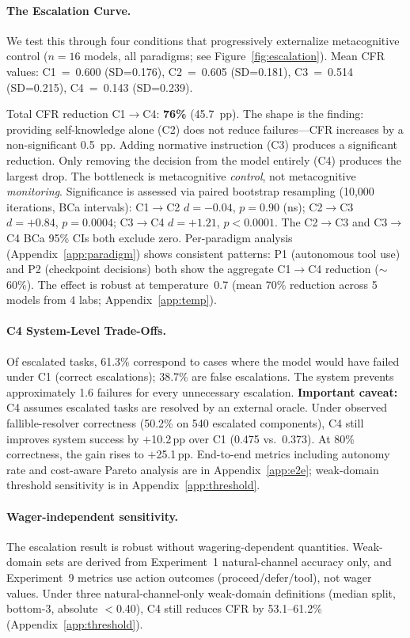 \documentclass[10pt]{article}
\newcommand{\CFR}{CFR}
\begin{document}
\paragraph{The Escalation Curve.}
We test this through four conditions that progressively externalize metacognitive
control ($n = 16$ models, all paradigms; see Figure~\ref{fig:escalation}).
Mean \CFR{} values: C1~=~0.600 (SD=0.176), C2~=~0.605 (SD=0.181), C3~=~0.514 (SD=0.215), C4~=~0.143 (SD=0.239).

Total \CFR{} reduction C1$\to$C4: \textbf{76\%} (45.7~pp).
The shape is the finding: providing self-knowledge alone (C2) does not reduce failures---\CFR{} increases by a non-significant 0.5~pp. Adding normative instruction (C3) produces a significant reduction. Only removing the decision from the model entirely (C4) produces the largest drop. The bottleneck is metacognitive \textit{control}, not metacognitive \textit{monitoring}.
Significance is assessed via paired bootstrap resampling (10{,}000 iterations, BCa intervals): C1$\to$C2 $d = -0.04$, $p = 0.90$ (ns); C2$\to$C3 $d = +0.84$, $p = 0.0004$; C3$\to$C4 $d = +1.21$, $p < 0.0001$. The C2$\to$C3 and C3$\to$C4 BCa 95\% CIs both exclude zero.
Per-paradigm analysis (Appendix~\ref{app:paradigm}) shows consistent patterns: P1 (autonomous tool use) and P2 (checkpoint decisions) both show the aggregate C1$\to$C4 reduction (${\sim}$60\%). The effect is robust at temperature~0.7 (mean 70\% reduction across 5 models from 4 labs; Appendix~\ref{app:temp}).


\paragraph{C4 System-Level Trade-Offs.}
Of escalated tasks, 61.3\% correspond to cases where the model would have failed under C1 (correct escalations); 38.7\% are false escalations. The system prevents approximately 1.6 failures for every unnecessary escalation.
\textbf{Important caveat:} C4 assumes escalated tasks are resolved by an external oracle. Under observed fallible-resolver correctness (50.2\% on 540 escalated components), C4 still improves system success by $+$10.2\,pp over C1 (0.475 vs.\ 0.373). At 80\% correctness, the gain rises to $+$25.1\,pp. End-to-end metrics including autonomy rate and cost-aware Pareto analysis are in Appendix~\ref{app:e2e}; weak-domain threshold sensitivity is in Appendix~\ref{app:threshold}.

\paragraph{Wager-independent sensitivity.}
The escalation result is robust without wagering-dependent quantities. Weak-domain sets are derived from Experiment~1 natural-channel accuracy only, and Experiment~9 metrics use action outcomes (proceed/defer/tool), not wager values. Under three natural-channel-only weak-domain definitions (median split, bottom-3, absolute $<$0.40), C4 still reduces CFR by 53.1--61.2\% (Appendix~\ref{app:threshold}).
\end{document}
